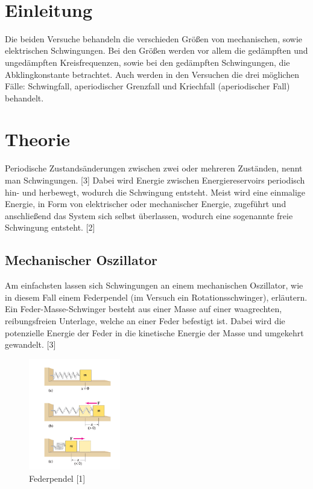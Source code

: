 \documentclass[a4paper]{scrartcl}
\def\header#1#2{
  \begin{center}
    {\Large #1}\\
    {#2}
  \end{center}
}
\numberwithin{equation}{subsection}
\begin{document}
\vspace{10pt}
\header{\HEADDING}{\SUBHEADDING}

\tableofcontents

\newpage

\section{Einleitung}
Die beiden Versuche behandeln die verschieden Größen von mechanischen, sowie elektrischen Schwingungen.
Bei den Größen werden vor allem die gedämpften und ungedämpften Kreisfrequenzen, sowie bei den gedämpften Schwingungen, die Abklingkonstante betrachtet.
Auch werden in den Versuchen die drei möglichen Fälle: Schwingfall, aperiodischer Grenzfall und Kriechfall (aperiodischer Fall) behandelt.

\newpage

\section{Theorie}
Periodische Zustandsänderungen zwischen zwei oder mehreren Zuständen, nennt man Schwingungen. [3]
Dabei wird Energie zwischen Energiereservoirs periodisch hin- und herbewegt, wodurch die Schwingung entsteht.
Meist wird eine einmalige Energie, in Form von elektrischer oder
mechanischer Energie, zugeführt und anschließend das System sich selbst überlassen, wodurch eine sogenannte freie Schwingung entsteht. [2]

\subsection{Mechanischer Oszillator}
Am einfachsten lassen sich Schwingungen an einem mechanischen Oszillator, wie in diesem Fall einem Federpendel (im Versuch ein Rotationsschwinger), erläutern. Ein Feder-Masse-Schwinger besteht aus einer Masse auf einer waagrechten, reibungsfreien Unterlage, welche an einer Feder befestigt ist. Dabei wird die potenzielle Energie der Feder in die kinetische Energie der Masse und umgekehrt gewandelt. [3]

\begin{figure}[H]
\includegraphics[width=4cm]{Grafik_Federpendel}
\centering
\caption{Federpendel [1]}
\centering
\end{figure}
\end{document}
